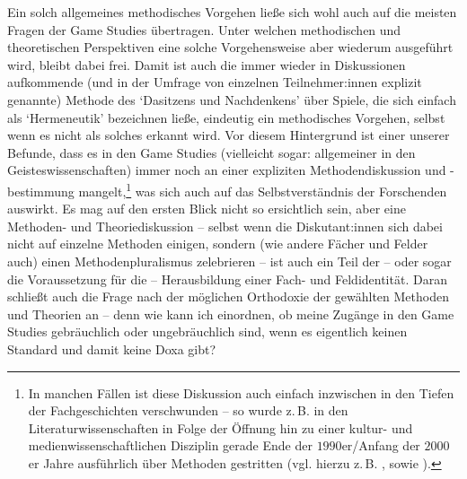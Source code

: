 \documentclass{scrartcl}
\begin{document}
Ein solch allgemeines methodisches Vorgehen ließe sich wohl auch auf die meisten Fragen der Game Studies übertragen.
Unter welchen methodischen und theoretischen Perspektiven eine solche Vorgehensweise aber wiederum ausgeführt wird, bleibt dabei frei.
Damit ist auch die immer wieder in Diskussionen aufkommende (und in der Umfrage von einzelnen Teilnehmer:innen explizit genannte) Methode des \enquote*{Dasitzens und Nachdenkens} über Spiele, die sich einfach als \enquote*{Hermeneutik} bezeichnen ließe, eindeutig ein methodisches Vorgehen, selbst wenn es nicht als solches erkannt wird.
Vor diesem Hintergrund ist einer unserer Befunde, dass es in den Game Studies (vielleicht sogar: allgemeiner in den Geisteswissenschaften) immer noch an einer expliziten Methodendiskussion und -bestimmung mangelt,\footnote{In manchen Fällen ist diese Diskussion auch einfach inzwischen in den Tiefen der Fachgeschichten verschwunden -- so wurde z.\,B. in den Literaturwissenschaften in Folge der Öffnung hin zu einer kultur- und medienwissenschaftlichen Disziplin gerade Ende der $1990$er/Anfang der $2000$er Jahre ausführlich über Methoden gestritten (vgl. hierzu z.\,B. \autocite[][S.~33--34]{dainat_literatur_2007}, sowie \autocite[][S.~11--12]{jahraus_literaturtheorie_2004}).} was sich auch auf das Selbstverständnis der Forschenden auswirkt.
Es mag auf den ersten Blick nicht so ersichtlich sein, aber eine Methoden- und Theoriediskussion -- selbst wenn die Diskutant:innen sich dabei nicht auf einzelne Methoden einigen, sondern (wie andere Fächer und Felder auch) einen Methodenpluralismus zelebrieren -- ist auch ein Teil der -- oder sogar die Voraussetzung für die -- Herausbildung einer Fach- und Feldidentität.
Daran schließt auch die Frage nach der möglichen Orthodoxie der gewählten Methoden und Theorien an -- denn wie kann ich einordnen, ob meine Zugänge in den Game Studies gebräuchlich oder ungebräuchlich sind, wenn es eigentlich keinen Standard und damit keine Doxa gibt?
\end{document}
